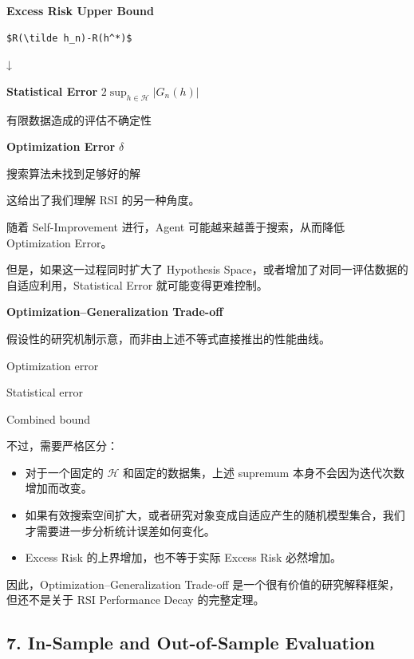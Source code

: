 \textbf{Excess Risk Upper Bound}

\begin{verbatim}
$R(\tilde h_n)-R(h^*)$
\end{verbatim}

↓

\textbf{Statistical Error} \(2\sup_{h\in\mathcal H}|G_n(h)|\)

有限数据造成的评估不确定性

\textbf{Optimization Error} \(\delta\)

搜索算法未找到足够好的解

这给出了我们理解 RSI 的另一种角度。

随着 Self-Improvement 进行，Agent 可能越来越善于搜索，从而降低 Optimization Error。

但是，如果这一过程同时扩大了 Hypothesis Space，或者增加了对同一评估数据的自适应利用，Statistical Error 就可能变得更难控制。

\textbf{Optimization--Generalization Trade-off}

假设性的研究机制示意，而非由上述不等式直接推出的性能曲线。


Optimization error

Statistical error

Combined bound

不过，需要严格区分：

\begin{itemize}
\tightlist
\item
  对于一个固定的 \(\mathcal H\) 和固定的数据集，上述 supremum 本身不会因为迭代次数增加而改变。
\item
  如果有效搜索空间扩大，或者研究对象变成自适应产生的随机模型集合，我们才需要进一步分析统计误差如何变化。
\item
  Excess Risk 的上界增加，也不等于实际 Excess Risk 必然增加。
\end{itemize}

因此，Optimization--Generalization Trade-off 是一个很有价值的研究解释框架，但还不是关于 RSI Performance Decay 的完整定理。

\hypertarget{part-2-12-0001-in-sample-and-out-of-sample-evaluation}{%
\subsection{7. In-Sample and Out-of-Sample Evaluation}\label{part-2-12-0001-in-sample-and-out-of-sample-evaluation}}

